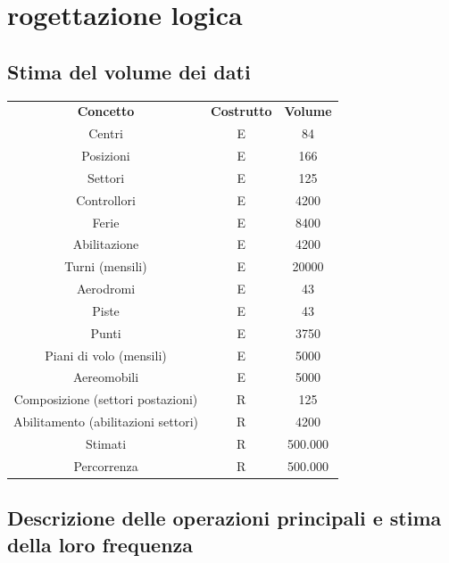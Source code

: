 \chapter{rogettazione logica}
\section{Stima del volume dei dati}
\begin{table}[H]
  \centering
  \begin{tabular}{ccc}
    \rowcolor{tableheadercolor}
    \textbf{Concetto} & \textbf{Costrutto} & \textbf{Volume} \\
    Centri & E & 84 \\
    Posizioni & E & 166 \\
    Settori & E & 125 \\
    Controllori & E & 4200 \\
    Ferie & E & 8400 \\
    Abilitazione & E & 4200 \\
    Turni (mensili) & E & 20000 \\
    Aerodromi & E & 43 \\
    Piste & E & 43 \\
    Punti & E & 3750 \\
    Piani di volo (mensili) & E & 5000 \\
    Aereomobili & E & 5000 \\
    Composizione (settori postazioni) & R & 125 \\
    Abilitamento (abilitazioni settori) & R & 4200 \\
    Stimati & R & 500.000 \\
    Percorrenza & R & 500.000 \\
  \end{tabular}
  \end{table}
  \section{Descrizione delle operazioni principali e stima della loro frequenza}

